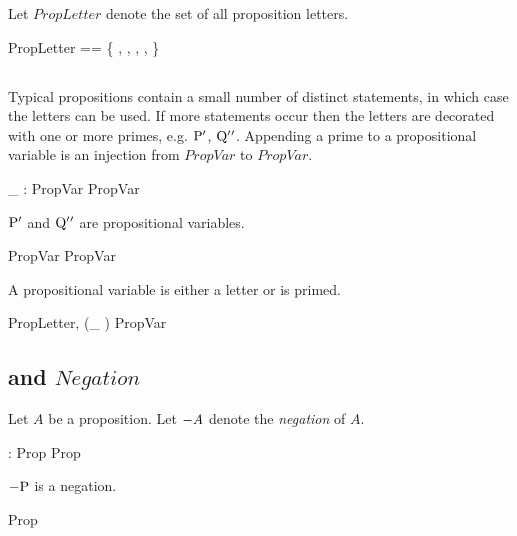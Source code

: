 \documentclass[11pt, oneside]{article}
\begin{document}
Let $PropLetter$ denote the set of all proposition letters.

\begin{zed}
	PropLetter == \{ \propP, \propQ, \propR, \propS, \propT \}
\end{zed}

\subsection{}

Typical propositions contain a small number of distinct statements, in which case the letters can be used.
If more statements occur then the letters are decorated with one or more primes, 
e.g. $\mathrm{P} {'}$, $\mathrm{Q} {'} {'}$.
Appending a prime to a propositional variable is an injection from $PropVar$ to $PropVar$.

\begin{axdef}
	\_ \propPrime: PropVar \inj PropVar
\end{axdef}

\begin{example}
$\mathrm{P} {'}$ and $\mathrm{Q} {'} {'}$ are propositional variables.
\begin{zed}
	\propP \propPrime \in PropVar
\also
	\propQ \propPrime \propPrime \in PropVar
\end{zed}

\end{example}

A propositional variable is either a letter or is primed.

\begin{zed}
	\langle PropLetter, \ran (\_ \propPrime) \rangle \partition PropVar
\end{zed}

\subsection{ and $Negation$}

Let $A$ be a proposition.
Let $- A$ denote the {\it negation} of $A$.

\begin{axdef}
	\notProp: Prop \inj Prop
\end{axdef}

\begin{example}
$- \mathrm{P}$ is a negation.

\begin{zed}
	\notProp \propP \in Prop
\end{zed}

\end{example}
\end{document}
